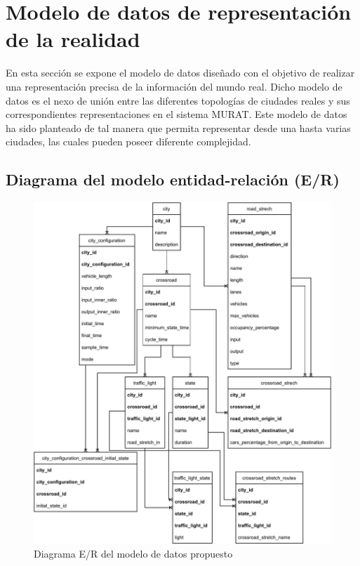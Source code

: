 \newpage
\section{Modelo de datos de representación de la realidad}
En esta sección se expone el modelo de datos diseñado con el objetivo de realizar una representación precisa de la información del mundo real. Dicho modelo de datos es el nexo de unión entre las diferentes topologías de ciudades reales y sus correspondientes representaciones en el sistema MURAT. Este modelo de datos ha sido planteado de tal manera que permita representar desde una hasta varias ciudades, las cuales pueden poseer diferente complejidad.

\newpage
\subsection{Diagrama del modelo entidad-relación (E/R)}
\begin{figure}[H]
    \centering
    \includegraphics[width=1\linewidth]{text/image/DE_R.pdf}
    \caption{Diagrama E/R del modelo de datos propuesto}
    \label{fig:de_r}
\end{figure}

